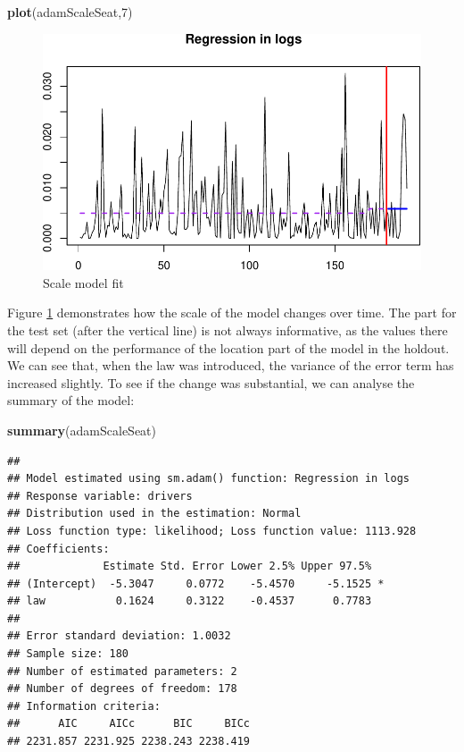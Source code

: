 \documentclass[]{book}
\newenvironment{Shaded}{\begin{snugshade}}{\end{snugshade}}
\newcommand{\DecValTok}[1]{\textcolor[rgb]{0.00,0.00,0.81}{#1}}
\newcommand{\KeywordTok}[1]{\textcolor[rgb]{0.13,0.29,0.53}{\textbf{#1}}}
\newcommand{\NormalTok}[1]{#1}
\theoremstyle{definition}
\theoremstyle{definition}
\theoremstyle{definition}
\theoremstyle{definition}
\theoremstyle{remark}
\begin{document}
\begin{Shaded}
\begin{Highlighting}[]
\KeywordTok{plot}\NormalTok{(adamScaleSeat,}\DecValTok{7}\NormalTok{)}
\end{Highlighting}
\end{Shaded}

\begin{figure}
\centering
\includegraphics{Svetunkov--2022----ADAM_files/figure-latex/adamModelETSXMNMSMTime-1.pdf}
\caption{\label{fig:adamModelETSXMNMSMTime}Scale model fit}
\end{figure}

Figure \ref{fig:adamModelETSXMNMSMTime} demonstrates how the scale of the model changes over time. The part for the test set (after the vertical line) is not always informative, as the values there will depend on the performance of the location part of the model in the holdout. We can see that, when the law was introduced, the variance of the error term has increased slightly. To see if the change was substantial, we can analyse the summary of the model:

\begin{Shaded}
\begin{Highlighting}[]
\KeywordTok{summary}\NormalTok{(adamScaleSeat)}
\end{Highlighting}
\end{Shaded}

\begin{verbatim}
## 
## Model estimated using sm.adam() function: Regression in logs
## Response variable: drivers
## Distribution used in the estimation: Normal
## Loss function type: likelihood; Loss function value: 1113.928
## Coefficients:
##             Estimate Std. Error Lower 2.5% Upper 97.5%  
## (Intercept)  -5.3047     0.0772    -5.4570     -5.1525 *
## law           0.1624     0.3122    -0.4537      0.7783  
## 
## Error standard deviation: 1.0032
## Sample size: 180
## Number of estimated parameters: 2
## Number of degrees of freedom: 178
## Information criteria:
##      AIC     AICc      BIC     BICc 
## 2231.857 2231.925 2238.243 2238.419
\end{verbatim}
\end{document}
